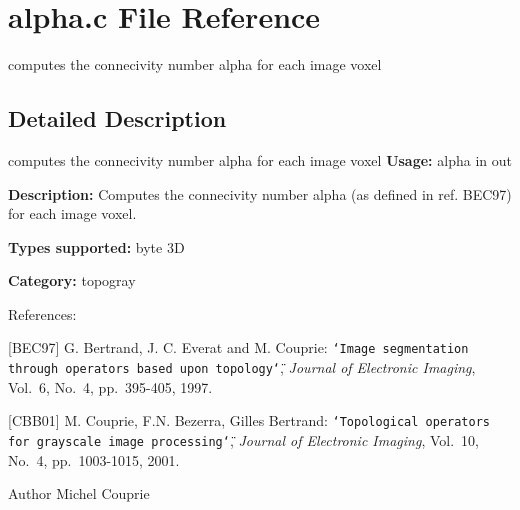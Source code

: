 \section{alpha.c File Reference}
\label{alpha_8c}


computes the connecivity number alpha for each image voxel  




\subsection{Detailed Description}
computes the connecivity number alpha for each image voxel {\bfseries Usage:} alpha in out

{\bfseries Description:} Computes the connecivity number alpha (as defined in ref. BEC97) for each image voxel.

{\bfseries Types supported:} byte 3D

{\bfseries Category:} topogray

References:

[BEC97] G. Bertrand, J. C. Everat and M. Couprie: {\tt \char`\"{}Image segmentation through operators based upon topology\char`\"{}}, {\itshape  Journal of Electronic Imaging\/}, Vol.~6, No.~4, pp.~395-\/405, 1997.

[CBB01] M. Couprie, F.N. Bezerra, Gilles Bertrand: {\tt \char`\"{}Topological operators for
grayscale image processing\char`\"{}}, {\itshape  Journal of Electronic Imaging\/}, Vol.~10, No.~4, pp.~1003-\/1015, 2001.

\begin{DoxyAuthor}{Author}
Michel Couprie 
\end{DoxyAuthor}
